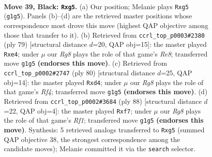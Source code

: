 \documentclass[11pt]{article}
\begin{document}
\clearpage

\begin{figure}[p]\centering
\begin{subfigure}{0.46\textwidth}\centering
\resizebox{\linewidth}{!}{%
\newchessgame
\chessboard[
  setfen={7k/p2p4/2p2p2/6R1/1P1P3K/8/5P1P/6r1 b - - 0 39},
  showmover=false,
  pgfstyle=straightmove, color=movearrow, markmove={g1-g5}
]}
\caption{}
\end{subfigure}\hfill
\begin{subfigure}{0.46\textwidth}\centering
\resizebox{\linewidth}{!}{%
\newchessgame
\chessboard[
  setfen={8/1k3p2/1p6/p7/4R3/PP1K4/5P2/4r3 b - - 0 40},
  showmover=false,
  pgfstyle=straightmove, color=movearrow, markmove={e1-e4}
]}
\caption{}
\end{subfigure}
\\[4pt]
\begin{subfigure}{0.46\textwidth}\centering
\resizebox{\linewidth}{!}{%
\newchessgame
\chessboard[
  setfen={8/p7/7p/2p1k3/3r1RPP/P3K3/8/8 w - - 6 41},
  showmover=false,
  pgfstyle=straightmove, color=movearrow, markmove={f4-d4}
]}
\caption{}
\end{subfigure}\hfill
\begin{subfigure}{0.46\textwidth}\centering
\resizebox{\linewidth}{!}{%
\newchessgame
\chessboard[
  setfen={8/5r2/6k1/1pp1p3/7p/2P4K/PP6/5R2 w - - 0 45},
  showmover=false,
  pgfstyle=straightmove, color=movearrow, markmove={f1-f7}
]}
\caption{}
\end{subfigure}
\caption{\textbf{Move 39, Black: \texttt{Rxg5}.} (a) Our position; Melanie plays \texttt{Rxg5} (\texttt{g1g5}). Panels (b)--(d) are the retrieved master positions whose correspondence most drove this move (highest QAP objective among those that transfer to it). (b) Retrieved from \texttt{ccrl\_top\_p0003\#2380} (ply 79) [structural distance $d$=20, QAP obj=15]: the master played \texttt{Rxe4}; under $\mu$ our \emph{Rg8} plays the role of that game's \emph{Re8}; transferred move \texttt{g1g5} \textbf{(endorses this move)}. (c) Retrieved from \texttt{ccrl\_top\_p0002\#2747} (ply 80) [structural distance $d$=25, QAP obj=14]: the master played \texttt{Rxd4}; under $\mu$ our \emph{Rg8} plays the role of that game's \emph{Rf4}; transferred move \texttt{g1g5} \textbf{(endorses this move)}. (d) Retrieved from \texttt{ccrl\_top\_p0002\#3684} (ply 88) [structural distance $d$=22, QAP obj=4]: the master played \texttt{Rxf7}; under $\mu$ our \emph{Rg8} plays the role of that game's \emph{Rf1}; transferred move \texttt{g1g5} \textbf{(endorses this move)}. Synthesis: 5 retrieved analogs transferred to \texttt{Rxg5} (summed QAP objective 38, the strongest correspondence among the candidate moves); Melanie committed it via the \texttt{search} selector.}
\label{fig:thought-m77}
\end{figure}
\end{document}
